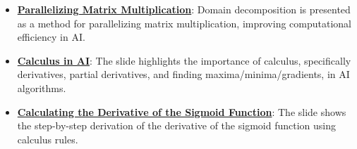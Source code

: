 \documentclass{article}%
\begin{document}
\begin{itemize}[leftmargin=*]
\item \href{https://purdue.brightspace.com/d2l/common/assets/pdfjs-d2l-dist/1.0.14-legacy/web/viewer.html?file=\%2Fcontent\%2Fenforced\%2F1095467-wl.202510.CS.24300.001\%2F04L1-Linear Algebra Primer.pdf\%3Fou\%3D1095467\&lang=en-us\&container=d2l-fileviewer-rendered-pdf\&fullscreen=d2l-fileviewer-rendered-pdf-dialog\&height=667#page=18}{\textbf{Parallelizing Matrix Multiplication}}: Domain decomposition is presented as a method for parallelizing matrix multiplication, improving computational efficiency in AI.%
\item \href{https://purdue.brightspace.com/d2l/common/assets/pdfjs-d2l-dist/1.0.14-legacy/web/viewer.html?file=\%2Fcontent\%2Fenforced\%2F1095467-wl.202510.CS.24300.001\%2F04L1-Linear Algebra Primer.pdf\%3Fou\%3D1095467\&lang=en-us\&container=d2l-fileviewer-rendered-pdf\&fullscreen=d2l-fileviewer-rendered-pdf-dialog\&height=667#page=19}{\textbf{Calculus in AI}}: The slide highlights the importance of calculus, specifically derivatives, partial derivatives, and finding maxima/minima/gradients, in AI algorithms.%
\item \href{https://purdue.brightspace.com/d2l/common/assets/pdfjs-d2l-dist/1.0.14-legacy/web/viewer.html?file=\%2Fcontent\%2Fenforced\%2F1095467-wl.202510.CS.24300.001\%2F04L1-Linear Algebra Primer.pdf\%3Fou\%3D1095467\&lang=en-us\&container=d2l-fileviewer-rendered-pdf\&fullscreen=d2l-fileviewer-rendered-pdf-dialog\&height=667#page=21}{\textbf{Calculating the Derivative of the Sigmoid Function}}: The slide shows the step{-}by{-}step derivation of the derivative of the sigmoid function using calculus rules.%
\end{itemize}%
\end{document}
